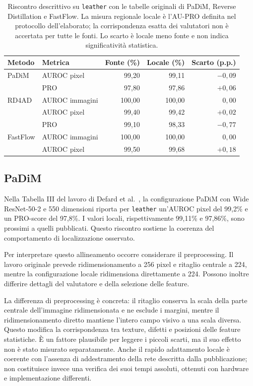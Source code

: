 \begin{table}[htbp]
\centering
\small
\begin{tabularx}{\textwidth}{lYrrr}
\hline
Metodo & Metrica & Fonte (\%) & Locale (\%) & Scarto (p.p.) \\
\hline
PaDiM & AUROC pixel & 99,20 & 99,11 & $-0,09$ \\
 & PRO & 97,80 & 97,86 & $+0,06$ \\
RD4AD & AUROC immagini & 100,00 & 100,00 & $0,00$ \\
 & AUROC pixel & 99,40 & 99,42 & $+0,02$ \\
 & PRO & 99,10 & 98,33 & $-0,77$ \\
FastFlow & AUROC immagini & 100,00 & 100,00 & $0,00$ \\
 & AUROC pixel & 99,50 & 99,68 & $+0,18$ \\
\hline
\end{tabularx}
\caption{Riscontro descrittivo su \texttt{leather} con le tabelle originali di PaDiM, Reverse Distillation e FastFlow. La misura regionale locale è l'AU-PRO definita nel protocollo dell'elaborato; la corrispondenza esatta dei valutatori non è accertata per tutte le fonti. Lo scarto è locale meno fonte e non indica significatività statistica.}
\label{tab:cap4-paper}
\end{table}

\subsection{PaDiM}

Nella Tabella III del lavoro di Defard et al.~\cite{Defard_et_al._2021}, la configurazione PaDiM con Wide ResNet-50-2 e 550 dimensioni riporta per \texttt{leather} un'AUROC pixel del 99,2\% e un PRO-score del 97,8\%. I valori locali, rispettivamente 99,11\% e 97,86\%, sono prossimi a quelli pubblicati. Questo riscontro sostiene la coerenza del comportamento di localizzazione osservato.

Per interpretare questo allineamento occorre considerare il preprocessing. Il lavoro originale prevede ridimensionamento a 256 pixel e ritaglio centrale a 224, mentre la configurazione locale ridimensiona direttamente a 224. Possono inoltre differire dettagli del valutatore e della selezione delle feature.

La differenza di preprocessing è concreta: il ritaglio conserva la scala della parte centrale dell'immagine ridimensionata e ne esclude i margini, mentre il ridimensionamento diretto mantiene l'intero campo visivo a una scala diversa. Questo modifica la corrispondenza tra texture, difetti e posizioni delle feature statistiche. È un fattore plausibile per leggere i piccoli scarti, ma il suo effetto non è stato misurato separatamente. Anche il rapido adattamento locale è coerente con l'assenza di addestramento della rete descritta dalla pubblicazione; non costituisce invece una verifica dei suoi tempi assoluti, ottenuti con hardware e implementazione differenti.

